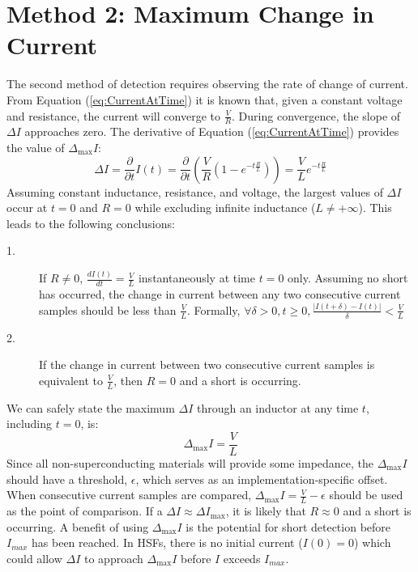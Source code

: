 \documentclass[11pt,oneside]{report}
\begin{document}
    \section{Method 2: Maximum Change in Current}
    The second method of detection requires observing the rate of change of current. From Equation (\ref{eq:CurrentAtTime}) it is known that, given a constant voltage and resistance, the current will converge to $\frac{V}{R}$. During convergence, the slope of $\Delta I$ approaches zero. The derivative of Equation (\ref{eq:CurrentAtTime}) provides the value of $\Delta_{\max}I$:
    \begin{equation}
    \Delta I = \frac{\partial}{\partial t}I(t) = \frac{\partial}{\partial t}(\frac{V}{R}(1-e^{-t \frac{R}{L}})) = \frac{V}{L}e^{-t \frac{R}{L}}
    \end{equation}
    Assuming constant inductance, resistance, and voltage, the largest values of $\Delta I$ occur at $t = 0$ and $R = 0$ while excluding infinite inductance ($L \neq +\infty$). This leads to the following conclusions:
    \begin{description}
    \item [1.] If $R \neq 0$, $\frac{dI(t)}{dt} = \frac{V}{L}$ instantaneously at time $t = 0$ only. Assuming no short has occurred, the change in current between any two consecutive current samples should be less than $\frac{V}{L}$. Formally, $\forall \delta > 0, t \geq 0, \frac{|I(t+\delta) - I(t)|}{\delta} < \frac{V}{L}$ 
    \item [2.] If the change in current between two consecutive current samples is equivalent to $\frac{V}{L}$, then $R = 0$ and a short is occurring.
    \end{description}
    
    We can safely state the maximum $\Delta I$ through an inductor at any time $t$, including $t = 0$, is:
    \begin{equation}\label{eq:DeltaMax}
    \Delta_{\max}I = \frac{V}{L} \nonumber
    \end{equation}
    Since all non-superconducting materials will provide some impedance, the $\Delta_{\max}I$ should have a threshold, $\epsilon$, which serves as an implementation-specific offset. When consecutive current samples are compared, $\Delta_{\max} I = \frac{V}{L} - \epsilon$ should be used as the point of comparison. If a $\Delta I \approx \Delta I_{\max}$, it is likely that $R \approx 0$ and a short is occurring. A benefit of using $\Delta_{\max}I$ is the potential for short detection before $I_{max}$ has been reached. In HSFs, there is no initial current ($I(0) = 0$) which could allow $\Delta I$ to approach $\Delta_{\max}I$ before $I$ exceeds $I_{max}$.
\end{document}

